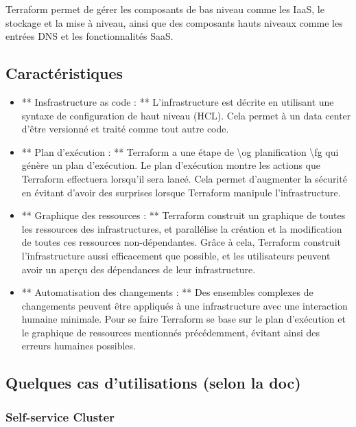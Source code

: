 \documentclass[]{article}
\begin{document}
Terraform permet de gérer les composants de bas niveau comme les IaaS,
le stockage et la mise à niveau, ainsi que des composants hauts niveaux
comme les entrées DNS et les fonctionnalités SaaS.

\subsection{Caractéristiques}\label{caractuxe9ristiques}

\begin{itemize}
\item
  ** Insfrastructure as code : ** L'infrastructure est décrite en
  utilisant une syntaxe de configuration de haut niveau (HCL). Cela
  permet à un data center d'être versionné et traité comme tout autre
  code.
\item
  ** Plan d'exécution : ** Terraform a une étape de \textbackslash{}og
  planification \textbackslash{}fg qui génère un plan d'exécution. Le
  plan d'exécution montre les actions que Terraform effectuera lorsqu'il
  sera lancé. Cela permet d'augmenter la sécurité en évitant d'avoir des
  surprises lorsque Terraform manipule l'infrastructure.
\item
  ** Graphique des ressources : ** Terraform construit un graphique de
  toutes les ressources des infrastructures, et parallélise la création
  et la modification de toutes ces ressources non-dépendantes. Grâce à
  cela, Terraform construit l'infrastructure aussi efficacement que
  possible, et les utilisateurs peuvent avoir un aperçu des dépendances
  de leur infrastructure.
\item
  ** Automatisation des changements : ** Des ensembles complexes de
  changements peuvent être appliqués à une infrastructure avec une
  interaction humaine minimale. Pour se faire Terraform se base sur le
  plan d'exécution et le graphique de ressources mentionnés
  précédemment, évitant ainsi des erreurs humaines possibles.
\end{itemize}

\subsection{Quelques cas d'utilisations (selon la
doc)}\label{quelques-cas-dutilisations-selon-la-doc}

\subsubsection{Self-service Cluster}\label{self-service-cluster}
\end{document}
